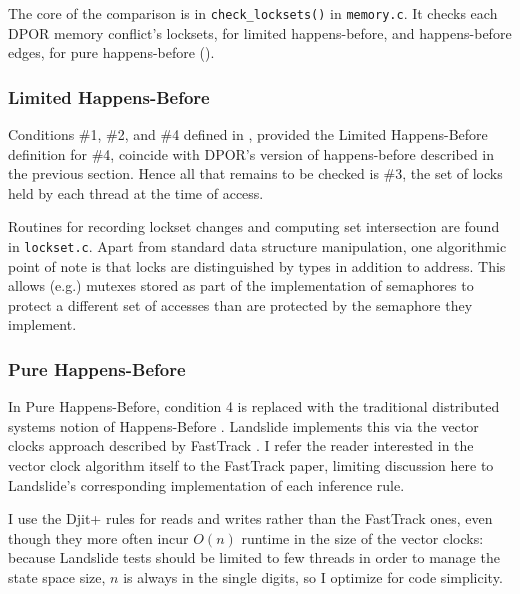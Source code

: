 The core of the comparison is in {\tt check\_locksets()} in {\tt memory.c}.
It checks each DPOR memory conflict's locksets, for limited happens-before,
and happens-before edges, for pure happens-before
(\sect{\ref{sec:background-hb}}).

\subsubsection{Limited Happens-Before}
\label{sec:landslide-lhb}

Conditions \#1, \#2, and \#4 defined in \sect{\ref{sec:background-hb}},
provided the Limited Happens-Before definition for \#4,
coincide with DPOR's version of happens-before described in the previous section.
Hence all that remains to be checked is \#3, the set of locks held by each thread at the time of access.

Routines for recording lockset changes and computing set intersection are found in {\tt lockset.c}.
Apart from standard data structure manipulation,
one algorithmic point of note is that locks are distinguished by types in addition to address.
This allows (e.g.) mutexes stored as part of the implementation of semaphores to protect a different set of accesses than are protected by the semaphore they implement.


\subsubsection{Pure Happens-Before}
\label{sec:landslide-phb}

In Pure Happens-Before,
condition 4 is replaced with the traditional distributed systems notion of Happens-Before \cite{lamport-clocks}.
Landslide implements this via the vector clocks approach described by {\sc FastTrack} \cite{fasttrack}.
I refer the reader interested in the vector clock algorithm itself to the {\sc FastTrack} paper,
limiting discussion here to Landslide's corresponding implementation of each inference rule.

I use the {\sc Djit+} rules for reads and writes rather than the {\sc FastTrack} ones,
even though they more often incur $O(n)$ runtime in the size of the vector clocks:
because Landslide tests should be limited to few threads in order to manage the state space size,
$n$ is always in the single digits, so I optimize for code simplicity.

